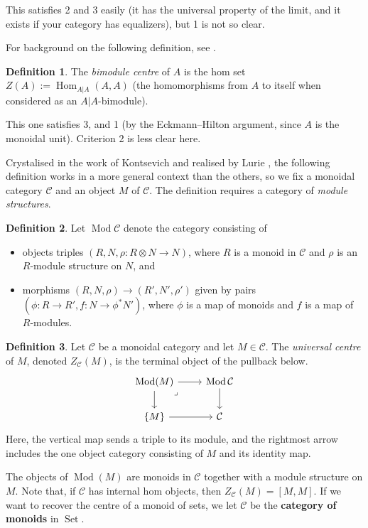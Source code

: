 \documentclass{article}
\newcommand{\C}{\mathcal{C}}
\newcommand{\set}[1]{\left\lbrace #1 \right\rbrace}
\DeclareMathOperator{\Hom}{Hom}
\DeclareMathOperator{\Mod}{Mod}
\DeclareMathOperator{\Set}{Set}
\theoremstyle{definition}
\newtheorem{definition}{Definition}
\begin{document}
This satisfies 2 and 3 easily (it has the universal property of the limit, and it exists if your category has equalizers), but 1 is not so clear.

For background on the following definition, see \cite{vitale}.
\begin{definition}
  The \textit{bimodule centre} of $A$ is the hom set $Z(A) := \Hom_{A|A}(A, A)$ (the homomorphisms from $A$ to itself when considered as an $A|A$-bimodule).
\end{definition}

This one satisfies 3, and 1 (by the Eckmann--Hilton argument, since $A$ is the monoidal unit).
Criterion 2 is less clear here.

Crystalised in the work of Kontsevich \cite[Claim 1]{kontsevich} and realised by Lurie \cite[5.3]{lurie}, the following definition works in a more general context than the others, so we fix a monoidal category $\C$ and an object $M$ of $\C$.
The definition requires a category of \textit{module structures}.

\begin{definition}
  Let $\Mod \C$ denote the category consisting of
  \begin{itemize}
    \item objects triples $(R, N, \rho : R \otimes N \to N)$, where $R$ is a monoid in $\C$ and $\rho$ is an $R$-module structure on $N$, and
    \item morphisms $(R, N, \rho) \to (R', N', \rho')$ given by pairs $(\phi : R \to R', f : N \to \phi^\ast N')$, where $\phi$ is a map of monoids and $f$ is a map of $R$-modules.
  \end{itemize}
\end{definition}

\begin{definition}
  Let $\C$ be a monoidal category and let $M \in \C$.
  The \textit{universal centre} of $M$, denoted $Z_\C(M)$, is the terminal object of the pullback below.
  \[\begin{tikzcd}
    {\Mod (M)} & {\Mod \C} \\
    {\set{M}} & \C
    \arrow[from=1-1, to=1-2]
    \arrow[from=1-1, to=2-1]
    \arrow["\lrcorner"{anchor=center, pos=0.125}, draw=none, from=1-1, to=2-2]
    \arrow[from=1-2, to=2-2]
    \arrow[from=2-1, to=2-2]
  \end{tikzcd}\]
  Here, the vertical map sends a triple to its module, and the rightmost arrow includes the one object category consisting of $M$ and its identity map.
\end{definition}
The objects of $\Mod(M)$ are monoids in $\C$ together with a module structure on $M$.
Note that, if $\C$ has internal hom objects, then $Z_\C(M) = [M, M]$.
If we want to recover the centre of a monoid of sets, we let $\C$ be the \textbf{category of monoids} in $\Set$.
\end{document}
